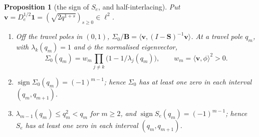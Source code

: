 \documentclass[11pt]{article}
\theoremstyle{plain}
\newtheorem{proposition}[theorem]{Proposition}
\theoremstyle{definition}
\theoremstyle{remark}
\begin{document}
\begin{proposition}[the sign of $S_e$, and half-interlacing]\label{prop:signlaws}
Put $\mathbf v=D_e^{1/2}\mathbf 1=(\sqrt{2q^{1+s}})_{s\ge0}\in\ell^2$.
\begin{enumerate}[label=\textup{(\alph*)},leftmargin=2.2em,itemsep=0.1em,topsep=0.2em]
\item Off the travel poles in $(0,1)$,
$\Sigma_0/\mathbf B=\langle\mathbf v,(I-\mathbf S)^{-1}\mathbf v\rangle$. At a travel pole $q_m$, with
$\lambda_k(q_m)=1$ and $\phi$ the normalised eigenvector,
\[
   \Sigma_0(q_m)=w_m\prod_{j\ne k}\bigl(1-1/\lambda_j(q_m)\bigr),\qquad
   w_m=\langle\mathbf v,\phi\rangle^2>0 .
\]
\item $\operatorname{sign}\Sigma_0(q_m)=(-1)^{m-1}$; hence
$\Sigma_0$ has at least one zero in each interval $(q_m,q_{m+1})$.
\item $\lambda_{m-1}(q_m)\le q_m^2<q_m$ for $m\ge2$, and
$\operatorname{sign}S_e(q_m)=(-1)^{m-1}$; hence $S_e$ has at least one zero in each interval
$(q_m,q_{m+1})$.
\end{enumerate}
\end{proposition}
\end{document}
